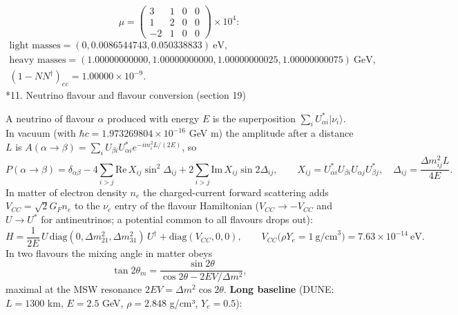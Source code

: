 \documentclass[10pt,a4paper]{article}
\makeatletter
\renewcommand\section{\@startsection{section}{1}{\z@}{-3.5ex \@plus -1ex \@minus -.2ex}{2.3ex \@plus.2ex}{\normalfont\Large\bfseries\raggedright}}
\makeatother
\begin{document}
\begin{equation*}
\mu=\begin{pmatrix}3&1&0&0\\1&2&0&0\\-2&1&0&0\end{pmatrix}\times10^{4}:
\end{equation*}
\begin{gather*}
\text{light masses}=(0, 0.0086544743, 0.050338833)\ \text{eV},\\ \text{heavy masses}=(1.00000000000, 1.00000000000, 1.00000000025, 1.00000000075)\ \text{GeV},\\ (1-NN^\dagger)_{ee}=1.00000\times10^{-9} .
\end{gather*}
\section*{11. Neutrino flavour and flavour conversion (section 19)}
A neutrino of flavour $\alpha$ produced with energy $E$ is the superposition $\sum_iU^*_{\alpha i}|\nu_i\rangle$. In vacuum (with $\hbar c=1.973269804\times10^{-16}$ GeV m) the amplitude after a distance $L$ is $A(\alpha\to\beta)=\sum_iU_{\beta i}U^*_{\alpha i}e^{-im_i^2L/(2E)}$, so
\begin{equation*}
P(\alpha\to\beta)=\delta_{\alpha\beta}-4\sum_{i>j}\mathrm{Re}\,X_{ij}\sin^2\Delta_{ij}+2\sum_{i>j}\mathrm{Im}\,X_{ij}\sin2\Delta_{ij},\qquad X_{ij}=U^*_{\alpha i}U_{\beta i}U_{\alpha j}U^*_{\beta j},\quad \Delta_{ij}=\frac{\Delta m^2_{ij}L}{4E}.
\end{equation*}
In matter of electron density $n_e$ the charged-current forward scattering adds $V_{CC}=\sqrt2G_Fn_e$ to the $\nu_e$ entry of the flavour Hamiltonian ($V_{CC}\to-V_{CC}$ and $U\to U^*$ for antineutrinos; a potential common to all flavours drops out):
\begin{equation*}
H=\frac1{2E}\,U\,\mathrm{diag}(0,\Delta m^2_{21},\Delta m^2_{31})\,U^\dagger+\mathrm{diag}(V_{CC},0,0),\qquad V_{CC}\big(\rho Y_e=1\ \text{g/cm}^3\big)=7.63\times10^{-14}\ \text{eV}.
\end{equation*}
In two flavours the mixing angle in matter obeys
\begin{equation*}
\tan2\theta_m=\frac{\sin2\theta}{\cos2\theta-2EV/\Delta m^2},
\end{equation*}
maximal at the MSW resonance $2EV=\Delta m^2\cos2\theta$. \textbf{Long baseline} (DUNE: $L=1300$ km, $E=2.5$ GeV, $\rho=2.848$ g/cm³, $Y_e=0.5$):
\end{document}
